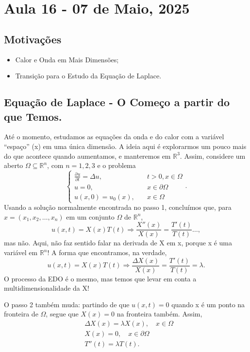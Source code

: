 \documentclass[../pde_notes.tex]{subfiles}
\begin{document}
\section{Aula 16 - 07 de Maio, 2025}
\subsection{Motivações}
\begin{itemize}
	\item Calor e Onda em Mais Dimensões;
	\item Transição para o Estudo da Equação de Laplace.
\end{itemize}
\subsection{Equação de Laplace - O Começo a partir do que Temos.}
Até o momento, estudamos as equações da onda e do calor com a variável ``espaço'' (x) em uma única dimensão. A ideia aqui é explorarmos um pouco mais do que acontece quando aumentamos, e manteremos em \(\mathbb{R}^{3}\). Assim, considere um
aberto \(\Omega \subseteq \mathbb{R}^{n}\), com \(n=1, 2, 3\) e o problema
\[
	\left\{\begin{array}{ll}
		\frac{\partial^{}u}{\partial t^{}} = \Delta u, & \quad t > 0, x\in \Omega   \\
		u = 0,                                         & \quad x\in \partial \Omega \\
		u(x, 0) = u_{0}(x),                            & \quad x\in \Omega
	\end{array}\right..
\]
Usando a solução normalmente encontrada no passo 1, concluímos que, para \(x=(x_1, x_2, \dotsc , x_{n})\) em um conjunto \(\Omega \) de \(\mathbb{R}^{n}\),
\[
	u(x, t) = X(x)T(t) \Rightarrow \frac{X''(x)}{X(x)}=\frac{T'(t)}{T(t)}\dotsc ,
\]
mas não. Aqui, não faz sentido falar na derivada de X em x, porque x é uma variável em \(\mathbb{R}^{n}\)! A forma que encontramos, na verdade,
\[
	u(x, t) = X(x)T(t) \Rightarrow \frac{\Delta X(x)}{X(x)} = \frac{T'(t)}{T(t)} = \lambda .
\]
O processo da EDO é o mesmo, mas temos que levar em conta a multidimensionalidade da X!

O passo 2 também muda: partindo de que \(u(x, t) = 0\) quando x é um ponto na fronteira de \(\Omega \), segue que \(X(x) = 0 \) na fronteira também. Assim,
\begin{align*}
	 & \Delta X(x) = \lambda X(x), \quad x\in \Omega \\
	 & X(x) = 0, \quad x\in \partial \Omega          \\
	 & T''(t) = \lambda T(t).
\end{align*}
\end{document}
